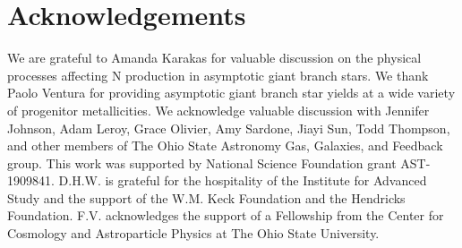\documentclass[ms.tex]{subfiles}
\begin{document}
\section{Acknowledgements}
\label{sec:acknowledgements}

We are grateful to Amanda Karakas for valuable discussion on the physical
processes affecting N production in asymptotic giant branch stars.
We thank Paolo Ventura for providing asymptotic giant branch star yields at a
wide variety of progenitor metallicities.
We acknowledge valuable discussion with Jennifer Johnson, Adam Leroy, Grace
Olivier, Amy Sardone, Jiayi Sun, Todd Thompson, and other members of The Ohio
State Astronomy Gas, Galaxies, and Feedback group.
This work was supported by National Science Foundation grant AST-1909841.
D.H.W. is grateful for the hospitality of the Institute for Advanced Study and
the support of the W.M. Keck Foundation and the Hendricks Foundation.
F.V. acknowledges the support of a Fellowship from the Center for Cosmology and
Astroparticle Physics at The Ohio State University.
\end{document}
